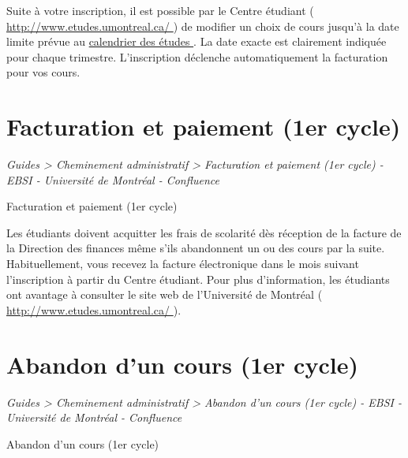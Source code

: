 \documentclass [12 pt]{article}
\begin{document}
            Suite à votre inscription, il est possible par le Centre étudiant (
        \href{
        http://www.etudes.umontreal.ca/
        } {
        http://www.etudes.umontreal.ca/
        }
    ) de modifier un choix de cours jusqu'à la
                date limite prévue au 
        \href{
        /pages/viewpage.action?pageId=124097784
        } {
        calendrier
                    des études
        }
    . La date exacte est clairement indiquée pour chaque trimestre.
                L'inscription déclenche automatiquement la facturation pour vos cours.
        
    
    
        \newpage
        \section {
        Facturation et paiement (1er cycle)
        }
        
        
        
        \textit{
        Guides > Cheminement administratif > Facturation et paiement (1er cycle) - EBSI
            - Université de Montréal - Confluence
        }
    
        Facturation et paiement (1er cycle)
        
            Les étudiants doivent acquitter les frais de scolarité dès réception de la facture de
                la Direction des finances même s'ils abandonnent un ou des cours par la suite.
                Habituellement, vous recevez la facture électronique dans le mois suivant
                l'inscription à partir du Centre étudiant. Pour plus d'information, les étudiants
                ont avantage à consulter le site web de l'Université de Montréal (
        \href{
        http://www.etudes.umontreal.ca/
        } {
        http://www.etudes.umontreal.ca/
        }
    ).
        
    
    
        \newpage
        \section {
        Abandon d'un cours (1er cycle)
        }
        
        
        
        \textit{
        Guides > Cheminement administratif > Abandon d'un cours (1er cycle) - EBSI
            - Université de Montréal - Confluence
        }
    
        Abandon d'un cours (1er cycle)
        
\end{document}
